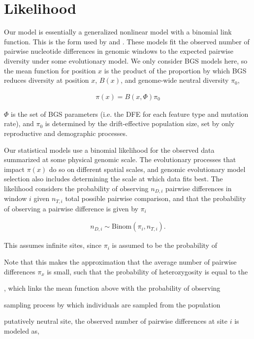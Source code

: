 \documentclass[11pt]{article}
\begin{document}
\section*{Likelihood}

Our model is essentially a generalized nonlinear model with a binomial link
function. This is the form used by \textcite{Elyashiv2016-vt} and
\textcite{Murphy2022-sj}. These models fit the observed number of pairwise
nucleotide differences in genomic windows to the expected pairwise diversity
under some evolutionary model. We only consider BGS models here, so the mean
function for position $x$ is the product of the proportion by which BGS reduces
diversity at position $x$, $B(x)$, and genome-wide neutral diversity $\pi_0$,

\begin{align}
  \pi(x) = B(x, \Phi) \pi_0
\end{align}

$\Phi$ is the set of BGS parameters (i.e. the DFE for each feature type and
mutation rate), and $\pi_0$ is determined by the drift-effective population
size, set by only reproductive and demographic processes. 

Our statistical models use a binomial likelihood for the observed data
summarized at some physical genomic scale. The evolutionary processes that
impact $\pi(x)$ do so on different spatial scales, and genomic evolutionary
model selection also includes determining the scale at which data fits best.
The likelihood considers the probability of observing $n_{D,i}$ pairwise
differences in window $i$ given $n_{T,i}$ total possible pairwise comparison,
and that the probability of observing a pairwise difference is given by $\pi_i$

\begin{align}
  n_{D,i} \sim \text{Binom}(\pi_i, n_{T,i}).
\end{align}

This assumes infinite sites, since $\pi_i$ is assumed to be the probability of

Note that this makes the approximation that the average number of pairwise
differences $\pi_x$ is small, such that the probability of heterozygosity
is equal to the 




, which links the mean function
above with the probability of observing 

sampling process by which individuals are sampled from the population

putatively neutral site, the observed number of pairwise differences at site
$i$ is modeled as,
\end{document}
